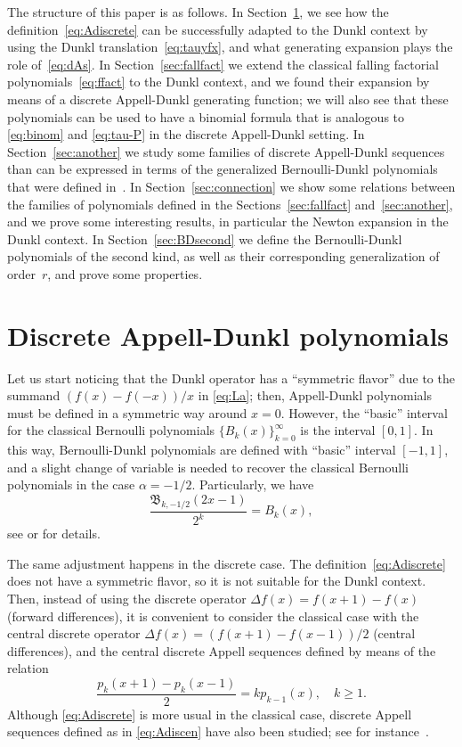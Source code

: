\documentclass[11pt]{article}
\theoremstyle{plain}
\theoremstyle{remark}
\numberwithin{equation}{section} %
\newcommand{\B}{\mathfrak{B}}
\begin{document}
The structure of this paper is as follows. 
In Section~\ref{sec:DAD}, we see how the definition~\eqref{eq:Adiscrete} can be successfully adapted to the Dunkl context by using the Dunkl translation~\eqref{eq:tauyfx}, and what generating expansion plays the role of~\eqref{eq:dAs}.
In Section~\ref{sec:fallfact} we extend the classical falling factorial polynomials~\eqref{eq:ffact} to the Dunkl context, and we found their expansion by means of a discrete Appell-Dunkl generating function;
we will also see that these polynomials can be used to have a binomial formula that is analogous to \eqref{eq:binom} and \eqref{eq:tau-P} in the discrete Appell-Dunkl setting.
In Section~\ref{sec:another} we study some families of discrete Appell-Dunkl sequences than can be expressed in terms of the generalized Bernoulli-Dunkl polynomials that were defined in~\cite{CMV}. 
In Section~\ref{sec:connection} we show some relations between the families of polynomials defined in the Sections~\ref{sec:fallfact} and~\ref{sec:another}, and we prove some interesting results, in particular the Newton expansion in the Dunkl context.
In Section~\ref{sec:BDsecond} we define the Bernoulli-Dunkl polynomials of the second kind, as well as their corresponding generalization of order~$r$, and prove some properties.

\section{Discrete Appell-Dunkl polynomials}
\label{sec:DAD}

Let us start noticing that the Dunkl operator has a ``symmetric flavor'' due to the summand $(f(x)-f(-x))/x$ in \eqref{eq:La}; then, Appell-Dunkl polynomials must be defined in a symmetric way around $x=0$. However, the ``basic'' interval for the classical Bernoulli polynomials $\{B_k(x)\}_{k=0}^{\infty}$ is the interval $[0,1]$. In this way, Bernoulli-Dunkl polynomials are defined with ``basic'' interval $[-1,1]$, and a slight change of variable is needed to recover the classical Bernoulli polynomials in the case $\alpha=-1/2$. Particularly, we have
\begin{equation}
\label{eq:BtoB}
  \frac{\B_{k,-1/2}(2x-1)}{2^k} = B_k(x),
\end{equation}
see \cite{CDPV} or \cite{CMV} for details.

The same adjustment happens in the discrete case. The definition~\eqref{eq:Adiscrete} does not have a symmetric flavor, so it is not suitable for the Dunkl context. 
Then, instead of using the discrete operator $\Delta f(x) = f(x+1) - f(x)$ (forward differences), it is convenient to consider the classical case with the central discrete operator $\Delta f(x) = (f(x+1) - f(x-1))/2$ (central differences),
and the central discrete Appell sequences defined by means of the relation
\begin{equation}
\label{eq:Adiscen}
  \frac{p_k(x+1) - p_k(x-1)}{2} = k p_{k-1}(x), \quad k \ge 1.
\end{equation}
Although \eqref{eq:Adiscrete} is more usual in the classical case, discrete Appell sequences defined as in \eqref{eq:Adiscen} have also been studied; see for instance~\cite[\S\,6]{Tem}. 
\end{document}
